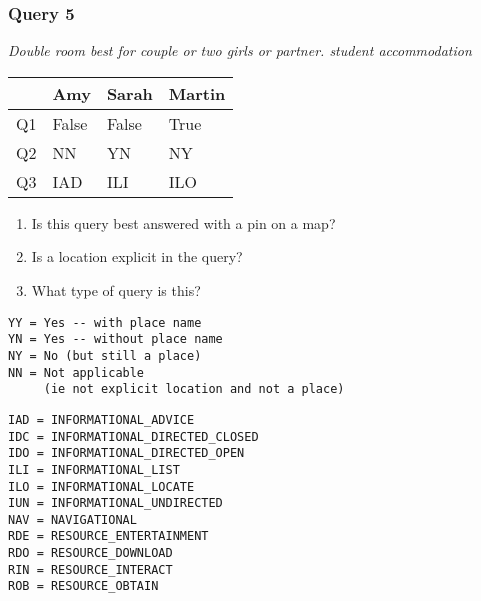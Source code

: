\begin{frame}[fragile]
\frametitle{Query 5}
\vspace{1em}

\emph{Double room  best for couple or two girls or partner. student accommodation}

\vfill

\begin{table}
  \centering
  \begin{tabular}{ l l l l }
    & \textbf{Amy} & \textbf{Sarah} & \textbf{Martin}\\
    \toprule
    Q1 & False & False & True\\
Q2 & NN & YN & NY\\
Q3 & IAD & ILI & ILO\\
    \bottomrule
  \end{tabular}
\end{table}

\vfill

\tiny{

\begin{enumerate}
\item Is this query best answered with a pin on a map?
\item Is a location explicit in the query?
\item What type of query is this?
\end{enumerate}

\vfill

\begin{multicols}{2}
\begin{verbatim}
YY = Yes -- with place name
YN = Yes -- without place name
NY = No (but still a place)
NN = Not applicable 
     (ie not explicit location and not a place)
\end{verbatim}

\columnbreak
\begin{verbatim}
IAD = INFORMATIONAL_ADVICE
IDC = INFORMATIONAL_DIRECTED_CLOSED
IDO = INFORMATIONAL_DIRECTED_OPEN
ILI = INFORMATIONAL_LIST
ILO = INFORMATIONAL_LOCATE
IUN = INFORMATIONAL_UNDIRECTED
NAV = NAVIGATIONAL
RDE = RESOURCE_ENTERTAINMENT
RDO = RESOURCE_DOWNLOAD
RIN = RESOURCE_INTERACT
ROB = RESOURCE_OBTAIN
\end{verbatim}
\end{multicols}
}

\end{frame}


